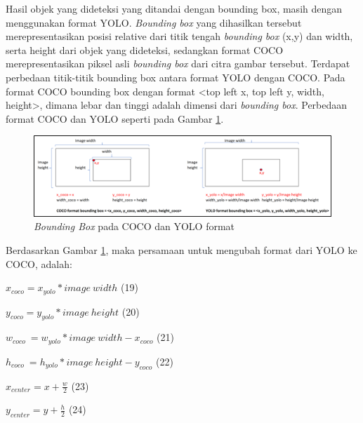 Hasil objek yang dideteksi yang ditandai dengan bounding box, masih dengan menggunakan format YOLO. \textit{Bounding box} yang dihasilkan tersebut merepresentasikan posisi relative dari titik tengah \textit{bounding box} (x,y) dan width, serta height dari objek yang dideteksi, sedangkan format COCO merepresentasikan piksel asli \textit{bounding box} dari citra gambar tersebut. Terdapat perbedaan titik-titik bounding box antara format YOLO dengan COCO. Pada format COCO bounding box dengan format <top left x, top left y, width, height>, dimana lebar dan tinggi adalah dimensi dari \textit{bounding box}. Perbedaan format COCO dan YOLO seperti pada Gambar \ref{img:Bounding-Box-Pada-COCO-dan-YOLO}. 

\begin{figure}[H]
	\vspace{-0.1cm}
	\begin{center}
		\includegraphics[width=1\columnwidth]{bab3/Gambar/Picture16.png}
	\end{center}
	\vspace{-0.2cm}
	\captionsetup{justification=centering}
	\caption{\textit{Bounding Box} pada COCO dan YOLO format}\label{img:Bounding-Box-Pada-COCO-dan-YOLO}
\end{figure}

Berdasarkan Gambar \ref{img:Bounding-Box-Pada-COCO-dan-YOLO}, maka persamaan untuk mengubah format dari YOLO ke COCO, adalah:

$x_{coco}=x_{yolo}\ast image\ width$ \hfill(19)

$y_{coco}=y_{yolo}\ast image\ height$ \hfill(20)

$w_{coco}\ =w_{yolo}\ast image\ width-x_{coco}$ \hfill(21)

$h_{coco}\ =h_{yolo}\ast image\ height-y_{coco}$ \hfill(22)

$x_{center}=x+\frac{w}{2} $ \hfill(23)

$y_{center}=y+\frac{h}{2}$ \hfill(24)

